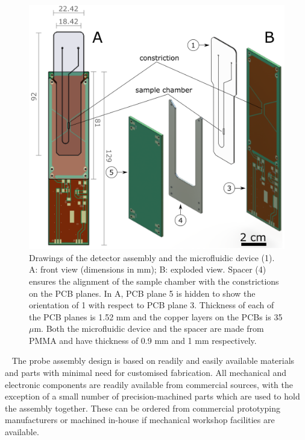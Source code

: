 \documentclass[preprint,5p]{elsarticle}
\begin{document}
\begin{figure}
\centering
\includegraphics[width=.8\linewidth,keepaspectratio=true]{./figures/ms5n17-tlp-im-190205-rf-device-assembly.png}
\caption{Drawings of the detector assembly and the microfluidic device (1). A: front view (dimensions in mm); B: exploded view. Spacer (4) ensures the alignment of the sample chamber with the constrictions on the PCB planes. In A, PCB plane 5 is hidden to show the orientation of 1 with respect to PCB plane 3. Thickness of each of the PCB planes is 1.52 mm and the copper layers on the PCBs is 35 $\mu$m. Both the microfluidic device and the spacer are made from PMMA and have thickness of 0.9 mm and 1 mm respectively.}
\label{fig:rf-device-assembly}
\end{figure}
\cbend\
The probe assembly design is based on readily and easily available materials and parts
with minimal need for customised fabrication.
All mechanical and electronic components are readily available from commercial sources,
with the exception of a small number of precision-machined parts which are used
to hold the assembly together. These can be ordered from commercial prototyping
manufacturers or machined in-house if mechanical workshop facilities are available.
\end{document}
